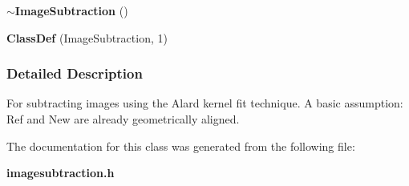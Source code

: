 \begin{CompactItemize}
\item 
{}
{\bf $\sim$Image\-Subtraction} ()\label{class_imagesubtraction_a19}

\item 
{}
{\bf Class\-Def} (Image\-Subtraction, 1)\label{class_imagesubtraction_a20}

\end{CompactItemize}


\subsubsection{Detailed Description}
For subtracting images using the Alard kernel fit technique. A basic assumption: Ref and New are already geometrically aligned.



The documentation for this class was generated from the following file:\begin{CompactItemize}
\item 
{\bf imagesubtraction.h}\end{CompactItemize}
